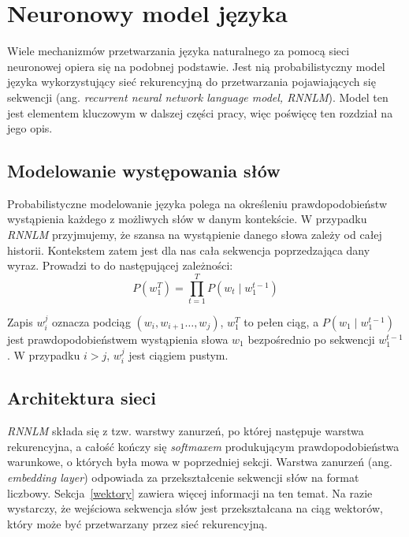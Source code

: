 
\setlength{\abovedisplayskip}{20pt}
\setlength{\belowdisplayskip}{20pt}

\chapter{Neuronowy model języka}
Wiele mechanizmów przetwarzania języka naturalnego za pomocą sieci neuronowej opiera się na podobnej podstawie. Jest nią probabilistyczny model języka wykorzystujący sieć rekurencyjną do przetwarzania pojawiających się sekwencji (ang. \textit{recurrent neural network language model, RNNLM}). Model ten jest elementem kluczowym w dalszej części pracy, więc poświęcę ten rozdział na jego opis.


\section{Modelowanie występowania słów}
Probabilistyczne modelowanie języka polega na określeniu prawdopodobieństw wystąpienia każdego z możliwych słów w danym kontekście. W przypadku \textit{RNNLM} przyjmujemy, że szansa na wystąpienie danego słowa zależy od całej historii. Kontekstem zatem jest dla nas cała sekwencja poprzedzająca dany wyraz. Prowadzi to do następującej zależności:
\[P(w_1^T) = \prod\limits_{t=1}^T P(w_t \mid w_1^{t-1})\]

Zapis $w_i^j$ oznacza podciąg $(w_i, w_{i+1} \dots, w_j)$, $w_1^T$ to pełen ciąg, a $P(w_1 \mid w_1^{t-1})$ jest prawdopodobieństwem wystąpienia słowa $w_1$ bezpośrednio po sekwencji $w_1^{t-1}$. W przypadku $i > j$, $w_i^j$ jest ciągiem pustym.


\section{Architektura sieci}
\textit{RNNLM} składa się z tzw. warstwy zanurzeń, po której następuje warstwa rekurencyjna, a całość kończy się \textit{softmaxem} produkującym prawdopodobieństwa warunkowe, o których była mowa w poprzedniej sekcji. Warstwa zanurzeń (ang. \textit{embedding layer}) odpowiada za przekształcenie sekwencji słów na format liczbowy. Sekcja~\ref{wektory} zawiera więcej informacji na ten temat. Na razie wystarczy, że wejściowa sekwencja słów jest przekształcana na ciąg wektorów, który może być przetwarzany przez sieć rekurencyjną.

